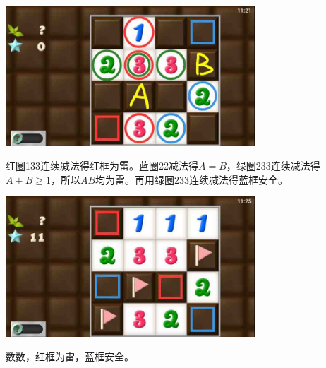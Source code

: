 \subsection{} %
\begin{center}
    \includegraphics[width=0.7\textwidth]{puzzlelow/164-1.jpg}
\end{center}
红圈133连续减法得红框为雷。蓝圈22减法得$A=B$，绿圈233连续减法得$A+B\ge 1$，所以$AB$均为雷。再用绿圈233连续减法得蓝框安全。
\begin{center}
    \includegraphics[width=0.7\textwidth]{puzzlelow/164-2.jpg}
\end{center}
数数，红框为雷，蓝框安全。

